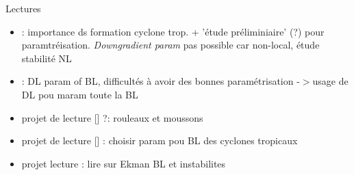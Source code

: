 \begin{frame}{Lectures}
\begin{itemize}
    \item \cite{foster_2005}: importance ds formation cyclone trop. + 'étude préliminiaire' (?) pour paramtréisation. \textit{Downgradient param } pas possible car non-local, étude stabilité NL 
    \item \cite{wang_2023}: DL param of BL, difficultés à avoir des bonnes paramétrisation -$>$usage de DL pou maram toute la BL
    \item projet de lecture [\cite{swathi_unique_2025}] ?: rouleaux et moussons 
    \item projet de lecture [\cite{kepert_choosing_2012}] : choisir param pou BL des cyclones tropicaux
    \item projet lecture : lire sur Ekman BL et instabilites 
\end{itemize}
\end{frame}

